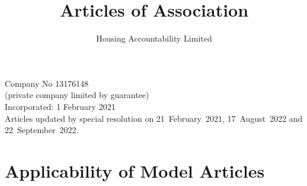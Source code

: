 \documentclass[10pt]{mk-articles-of-association}
\newcommand{\Name}[0]{Housing Accountability Limited}
\begin{document}
\title{
Articles of Association\\
}
\author{\Name{}\\
}
\date{}

\maketitle

\begin{center}
Company No 13176148\\
(private company limited by guarantee)\\
\medskip
Incorporated: 1 February 2021 \\
\medskip
Articles updated by special resolution on 21~February~2021, 17~August~2022
and 22~September~2022.
\end{center}



\section*{Applicability of Model Articles}
\end{document}
